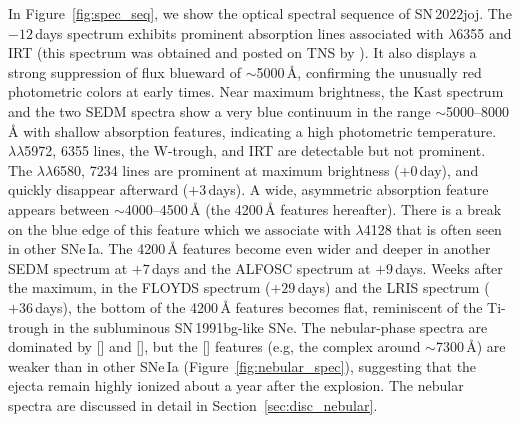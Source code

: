 \documentclass[twocolumn]{aastex631}
\newcommand{\sn}{SN\,2022joj}
\begin{document}
\begin{CJK*}{UTF8}{gbsn}
In Figure~\ref{fig:spec_seq}, we show the optical spectral sequence of \sn. The $-12$\,days spectrum exhibits prominent absorption lines associated with  $\lambda$6355 and  IRT (this spectrum was obtained and posted on TNS by \citealt{Newsome_2022TNSCR}). It also displays a strong suppression of flux blueward of $\sim$5000\,\r{A}, confirming the unusually red photometric colors at early times. Near maximum brightness, the Kast spectrum and the two SEDM spectra show a very blue continuum in the range $\sim$5000--8000\,\r{A} with shallow absorption features, indicating a high photometric temperature.  $\lambda\lambda$5972, 6355 lines, the  W-trough, and  IRT are detectable but not prominent. The  $\lambda\lambda$6580, 7234 lines are prominent at maximum brightness ($+0$\,day), and quickly disappear afterward ($+3$\,days). A wide, asymmetric absorption feature appears between $\sim$4000--4500\,\r{A} (the 4200\,\r{A} features hereafter). There is a break on the blue edge of this feature which we associate with  $\lambda$4128 that is often seen in other SNe\,Ia.
The 4200\,\r{A} features become even wider and deeper in another SEDM spectrum at $+7$\,days and the ALFOSC spectrum at $+9$\,days. Weeks after the maximum, in the FLOYDS spectrum ($+29$\,days) and the LRIS spectrum ($+36$\,days), the bottom of the 4200\,\r{A} features becomes flat, reminiscent of the Ti-trough in the subluminous SN\,1991bg-like \citep[91bg-like;][]{Filippenko_91bg_1992,Leibundgut_91bg_1993} SNe. The nebular-phase spectra are dominated by [] and [], but the [] features (e.g, the complex around $\sim$7300\,\r{A}) are weaker than in other SNe\,Ia (Figure~\ref{fig:nebular_spec}), suggesting that the ejecta remain highly ionized about a year after the explosion. The nebular spectra are discussed in detail in Section~\ref{sec:disc_nebular}.


\end{CJK*}
\end{document}
